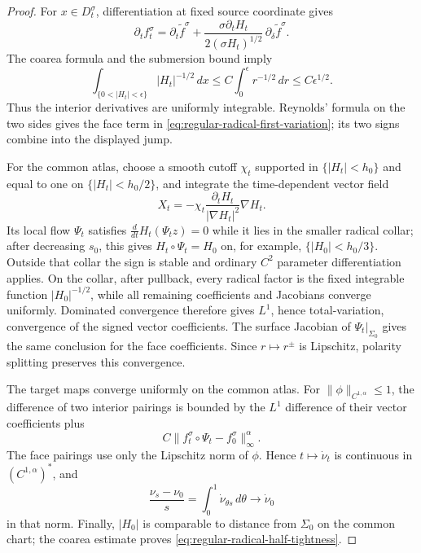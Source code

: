 \documentclass[11pt]{article}
\begin{document}
\begin{proof}
For $x\in D_t^\sigma$, differentiation at fixed source coordinate gives
\[
 \partial_tf_t^\sigma
 =\partial_t\widetilde f^\sigma
 +\frac{\sigma\partial_tH_t}
 {2(\sigma H_t)^{1/2}}\,
 \partial_\delta\widetilde f^\sigma.
\]
The coarea formula and the submersion bound imply
\[
 \int_{\{0<|H_t|<\epsilon\}}|H_t|^{-1/2}\,dx
 \le C\int_0^\epsilon r^{-1/2}\,dr
 \le C\epsilon^{1/2}.
\]
Thus the interior derivatives are uniformly integrable.  Reynolds'
formula on the two sides gives the face term in
\eqref{eq:regular-radical-first-variation}; its two signs combine into the
displayed jump.

For the common atlas, choose a smooth cutoff $\chi_t$ supported in
$\{|H_t|<h_0\}$ and equal to one on $\{|H_t|<h_0/2\}$, and integrate the
time-dependent vector field
\[
 X_t=-\chi_t\frac{\partial_tH_t}{|\nabla H_t|^2}\nabla H_t.
\]
Its local flow $\Psi_t$ satisfies
$\frac d{dt}H_t(\Psi_tz)=0$ while it lies in the smaller radical collar;
after decreasing $s_0$, this gives $H_t\circ\Psi_t=H_0$ on, for example,
$\{|H_0|<h_0/3\}$.  Outside that collar the sign is stable and ordinary
$C^2$ parameter differentiation applies.  On the collar, after pullback,
every radical factor is the
fixed integrable function $|H_0|^{-1/2}$, while all remaining
coefficients and Jacobians converge uniformly.  Dominated convergence
therefore gives $L^1$, hence total-variation, convergence of the signed
vector coefficients.  The surface Jacobian of
$\Psi_t|_{\Sigma_0}$ gives the same conclusion for the face coefficients.
Since $r\mapsto r^\pm$ is Lipschitz, polarity splitting preserves this
convergence.

The target maps converge uniformly on the common atlas.  For
$\|\phi\|_{C^{1,\alpha}}\le1$, the difference of two interior pairings is
bounded by the $L^1$ difference of their vector coefficients plus
\[
 C\|f_t^\sigma\circ\Psi_t-f_0^\sigma\|_\infty^\alpha.
\]
The face pairings use only the Lipschitz norm of $\phi$.  Hence
$t\mapsto\dot\nu_t$ is continuous in $(C^{1,\alpha})^*$, and
\[
 \frac{\nu_s-\nu_0}{s}
 =\int_0^1\dot\nu_{\theta s}\,d\theta
 \longrightarrow\dot\nu_0
\]
in that norm.  Finally, $|H_0|$ is comparable to distance from
$\Sigma_0$ on the common chart; the coarea estimate proves
\eqref{eq:regular-radical-half-tightness}.
\end{proof}
\end{document}
